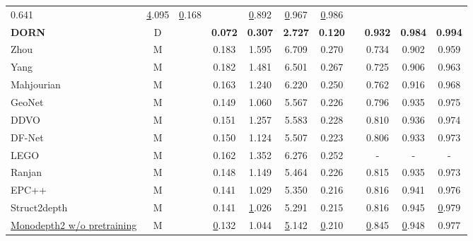 \begin{table}[h]
{\begin{tabular}{lcccccccccc}
			0.641 &
			{\ul 4.095} &
			{\ul 0.168} &
			{\ul } &
			{\ul 0.892} &
			{\ul 0.967} &
			{\ul 0.986} \\
			\textbf{DORN} \cite{fu2018deep} &
			D &
			&
			\textbf{0.072} &
			\textbf{0.307} &
			\textbf{2.727} &
			\textbf{0.120} &
			\textbf{} &
			\textbf{0.932} &
			\textbf{0.984} &
			\textbf{0.994} \\ \hline
			Zhou \cite{zhou2017unsupervised}                      & M       &  & 0.183       & 1.595       & 6.709  & 0.270    &  & 0.734 & 0.902       & 0.959          \\
			Yang \cite{yang2017unsupervised}                      & M       &  & 0.182       & 1.481       & 6.501  & 0.267    &  & 0.725 & 0.906       & 0.963          \\
			Mahjourian \cite{mahjourian2018unsupervised}                & M       &  & 0.163       & 1.240       & 6.220  & 0.250    &  & 0.762 & 0.916       & 0.968          \\
			GeoNet \cite{yin2018geonet}                     & M       &  & 0.149       & 1.060       & 5.567  & 0.226    &  & 0.796 & 0.935       & 0.975          \\
			DDVO \cite{wang2018learning}                      & M       &  & 0.151       & 1.257       & 5.583  & 0.228    &  & 0.810 & 0.936       & 0.974          \\
			DF-Net \cite{zou2018df}                    & M       &  & 0.150       & 1.124       & 5.507  & 0.223    &  & 0.806 & 0.933       & 0.973          \\
			LEGO \cite{yang2018lego}                      & M       &  & 0.162       & 1.352       & 6.276  & 0.252    &  & -     & -           & -              \\
			Ranjan \cite{ranjan2019competitive}                    & M       &  & 0.148       & 1.149       & 5.464  & 0.226    &  & 0.815 & 0.935       & 0.973          \\
			EPC++ \cite{luo2019every}                     & M       &  & 0.141       & 1.029       & 5.350  & 0.216    &  & 0.816 & 0.941       & 0.976          \\
			Struct2depth \cite{casser2019depth}              & M       &  & 0.141       & {\ul 1.026} & 5.291  & 0.215    &  & 0.816 & 0.945       & {\ul 0.979}    \\
			{\underline{Monodepth2 w/o pretraining} \cite{godard2019digging}} &
			M &
			&
			{\ul 0.132} &
			1.044 &
			{\ul 5.142} &
			{\ul 0.210} &
			&
			{\ul 0.845} &
			{\ul 0.948} &
			0.977 \\

\end{tabular}}
\end{table}
